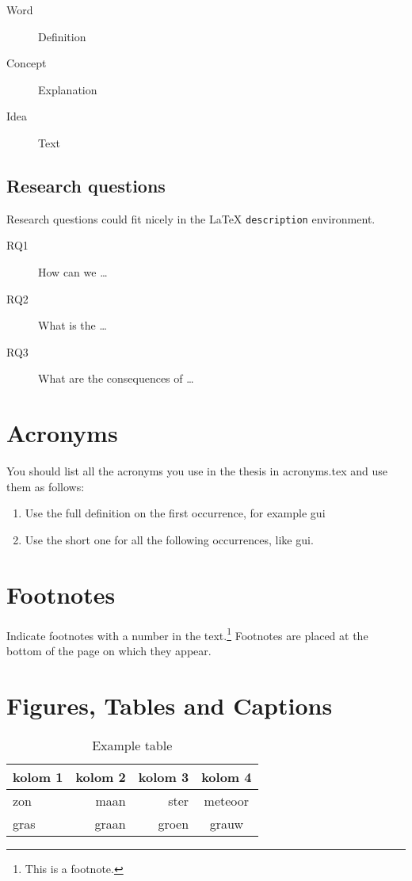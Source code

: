 \begin{description}
\item[Word] Definition
\item[Concept] Explanation
\item[Idea] Text
\end{description}

\subsection{Research questions}

Research questions could fit nicely in the \LaTeX{} {\tt description} environment.

\begin{description}
	\item [RQ1] How can we \dots
	\item [RQ2] What is the \dots
	\item [RQ3] What are the consequences of \dots
\end{description}

\section{Acronyms}
You should list all the acronyms you use in the thesis in acronyms.tex and use them as follows:

\begin{enumerate}
\item Use the full definition on the first occurrence, for example \acrfull{gui}
\item Use the short one for all the following occurrences, like \acrshort{gui}.
\end{enumerate}


\section{Footnotes}

Indicate footnotes with a number in the text.\footnote{This is a footnote.}
Footnotes are placed at the bottom of the page on which they appear. 


\section{Figures, Tables and Captions}

\begin{table}[h!tbp]
\begin{tabular}{l | r | r| c}
kolom 1 & kolom 2 & kolom 3 & kolom 4 \\
\hline
zon & maan & ster & meteoor\\
gras & graan & groen & grauw\\
\end{tabular}
\caption{Example table}
\label{table-example}
\end{table}

